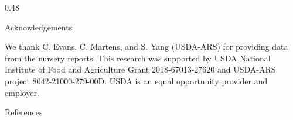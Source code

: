 \documentclass[final]{beamer}
\newlength{\twocolwid}
\begin{document}
\begin{frame}[t]
\begin{columns}[t]
\begin{column}{\twocolwid}
\begin{columns}[t,totalwidth=\twocolwid]
\begin{column}{0.48\twocolwid}
\begin{block}{\large{Acknowledgements}}
\begin{footnotesize}
We thank C. Evans, C. Martens, and S. Yang (USDA-ARS) for providing data from the nursery reports. This research was supported by USDA National Institute of Food and Agriculture Grant 2018-67013-27620 and USDA-ARS project 8042-21000-279-00D. USDA is an equal opportunity provider and employer.

\end{footnotesize}

\end{block}



\begin{block}{\large{References}}



\begin{footnotesize}





\end{footnotesize}

\end{block}


%
%
%
%



\end{column}
\end{columns}
\end{column}
\end{columns}
\end{frame}
\end{document}

